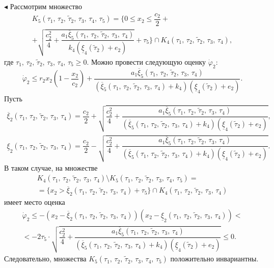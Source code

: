 \documentclass[12pt,a4paper]{extarticle}
\renewenvironment{proof}{\noindent$\blacktriangleleft$}{}
\theoremstyle{definition}
\theoremstyle{definition}
\theoremstyle{definition}
\begin{document}
\begin{proof}
		Рассмотрим множество 
		\begin{multline*}
			K_5(\tau_1,\,\tau_2,\,\tilde{\tau}_2,\,\tau_3,\,\tau_4,\,\tau_5) = \{0 \le x_2 \le \dfrac{c_2}{2}+\\
			+\sqrt{\dfrac{c_2^2}{4}+\dfrac{a_1\overline{\xi}_5(\tau_1,\,\tau_2,\,\tilde{\tau}_2,\,\tau_3,\,\tau_4)}{k_4(\underline{\xi}_4(\tilde{\tau}_2)+e_2)}}+\tau_5\}\cap K_4(\tau_1,\,\tau_2,\,\tilde{\tau}_2,\,\tau_3,\,\tau_4),
		\end{multline*}
		где $\tau_1,\,\tau_2,\,\tilde{\tau}_2,\,\tau_3,\,\tau_4,\,\tau_5 \ge 0$.
		Можно провести следующую оценку $\dot{\varphi}_2$:
		\[\dot{\varphi}_2 \le r_2x_2\left(1-\dfrac{x_2}{c_2}\right)+\dfrac{a_1\overline{\xi}_5(\tau_1,\,\tau_2,\,\tilde{\tau}_2,\,\tau_3,\,\tau_4)}{(\overline{\xi}_5(\tau_1,\,\tau_2,\,\tilde{\tau}_2,\,\tau_3,\,\tau_4)+k_4)(\underline{\xi}_4(\tilde{\tau}_2)+e_2)}.\]
		Пусть
		\begin{align*}
			\overline{\xi}_2(\tau_1,\,\tau_2,\,\tilde{\tau}_2,\,\tau_3,\,\tau_4) = \dfrac{c_2}{2}+\sqrt{\dfrac{c_2^2}{4}+\dfrac{a_1\overline{\xi}_5(\tau_1,\,\tau_2,\,\tilde{\tau}_2,\,\tau_3,\,\tau_4)}{(\overline{\xi}_5(\tau_1,\,\tau_2,\,\tilde{\tau}_2,\,\tau_3,\,\tau_4)+k_4)(\underline{\xi}_4(\tilde{\tau}_2)+e_2)}},\\
			\underline{\xi}_2(\tau_1,\,\tau_2,\,\tilde{\tau}_2,\,\tau_3,\,\tau_4) = \dfrac{c_2}{2}-\sqrt{\dfrac{c_2^2}{4}+\dfrac{a_1\overline{\xi}_5(\tau_1,\,\tau_2,\,\tilde{\tau}_2,\,\tau_3,\,\tau_4)}{(\overline{\xi}_5(\tau_1,\,\tau_2,\,\tilde{\tau}_2,\,\tau_3,\,\tau_4)+k_4)(\underline{\xi}_4(\tilde{\tau}_2)+e_2)}}.
		\end{align*}
		В таком случае, на множестве 
		\begin{multline*}
			K_4(\tau_1,\,\tau_2,\,\tilde{\tau}_2,\,\tau_3,\,\tau_4)\setminus K_5(\tau_1,\,\tau_2,\,\tilde{\tau}_2,\,\tau_3,\,\tau_4,\,\tau_5) =\\
			=\{x_2 > \overline{\xi}_2(\tau_1,\,\tau_2,\,\tilde{\tau}_2,\,\tau_3,\,\tau_4)+\tau_5\}\cap K_4(\tau_1,\,\tau_2,\,\tilde{\tau}_2,\,\tau_3,\,\tau_4)
		\end{multline*}
		имеет место оценка
		\begin{multline*}
			\dot{\varphi}_2 \le -(x_2 - \overline{\xi}_2(\tau_1,\,\tau_2,\,\tilde{\tau}_2,\,\tau_3,\,\tau_4))(x_2 - \underline{\xi}_2(\tau_1,\,\tau_2,\,\tilde{\tau}_2,\,\tau_3,\,\tau_4)) <\\
			< -2\tau_5\cdot\sqrt{\dfrac{c_2^2}{4}+\dfrac{a_1\overline{\xi}_5(\tau_1,\,\tau_2,\,\tilde{\tau}_2,\,\tau_3,\,\tau_4)}{(\overline{\xi}_5(\tau_1,\,\tau_2,\,\tilde{\tau}_2,\,\tau_3,\,\tau_4)+k_4)(\underline{\xi}_4(\tilde{\tau}_2)+e_2)}} \le 0.
		\end{multline*}
		Следовательно, множества $K_5(\tau_1,\,\tau_2,\,\tilde{\tau}_2,\,\tau_3,\,\tau_4,\,\tau_5)$ положительно инвариантны.
		

\end{proof}
\end{document}
